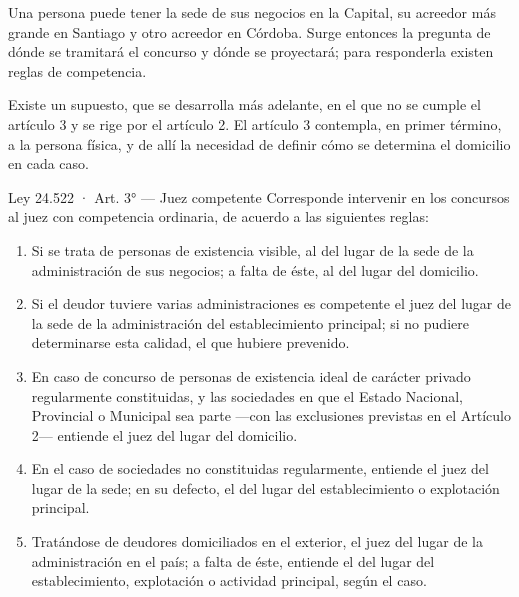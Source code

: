 \documentclass[12pt,oneside]{book}
\begin{document}
Una persona puede tener la sede de sus negocios en la Capital, su acreedor más grande en Santiago y otro acreedor en Córdoba. Surge entonces la pregunta de dónde se tramitará el concurso y dónde se proyectará; para responderla existen reglas de competencia.

Existe un supuesto, que se desarrolla más adelante, en el que no se cumple el artículo 3 y se rige por el artículo 2. El artículo 3 contempla, en primer término, a la persona física, y de allí la necesidad de definir cómo se determina el domicilio en cada caso.

\begin{norma}{Ley 24.522 · Art. 3° — Juez competente}
Corresponde intervenir en los concursos al juez con competencia ordinaria, de acuerdo a las siguientes reglas:
\begin{enumerate}[label=\arabic*),leftmargin=*]
    \item Si se trata de personas de existencia visible, al del lugar de la sede de la administración de sus negocios; a falta de éste, al del lugar del domicilio.
    \item Si el deudor tuviere varias administraciones es competente el juez del lugar de la sede de la administración del establecimiento principal; si no pudiere determinarse esta calidad, el que hubiere prevenido.
    \item En caso de concurso de personas de existencia ideal de carácter privado regularmente constituidas, y las sociedades en que el Estado Nacional, Provincial o Municipal sea parte ---con las exclusiones previstas en el Artículo 2--- entiende el juez del lugar del domicilio.
    \item En el caso de sociedades no constituidas regularmente, entiende el juez del lugar de la sede; en su defecto, el del lugar del establecimiento o explotación principal.
    \item Tratándose de deudores domiciliados en el exterior, el juez del lugar de la administración en el país; a falta de éste, entiende el del lugar del establecimiento, explotación o actividad principal, según el caso.
\end{enumerate}
\end{norma}
\end{document}

